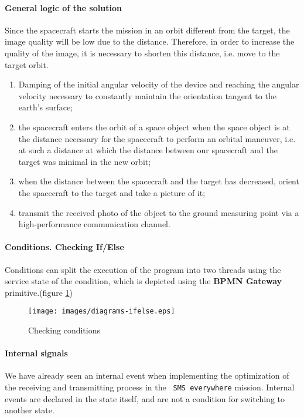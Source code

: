 \documentclass[12pt,a4paper]{article}
\begin{document}
\paragraph{General logic of the solution} 

Since the spacecraft starts the mission in an orbit different from the target, the image quality will be low due to the distance. Therefore, in order to increase the quality of the image, it is necessary to shorten this distance, i.e. move to the target orbit.

\begin{enumerate}
\item Damping of the initial angular velocity of the device and reaching the angular velocity necessary to constantly maintain the orientation tangent to the earth's surface;
\item the spacecraft enters the orbit of a space object when the space object is at the distance necessary for the spacecraft to perform an orbital maneuver, i.e. at such a distance at which the distance between our spacecraft and the target was minimal in the new orbit;
\item when the distance between the spacecraft and the target has decreased, orient the spacecraft to the target and take a picture of it;
\item transmit the received photo of the object to the ground measuring point via a high-performance communication channel.
\end{enumerate}

\paragraph{Conditions. Checking If/Else} Conditions can split the execution of the program into two threads using the service state of the condition, which is depicted using the \textbf{BPMN Gateway} primitive.(figure \ref{Pic:IfElse})

\begin{figure}[tbh]
  \begin{center}
    \texttt{[image: images/diagrams-ifelse.eps]}
    \caption{Checking conditions}
    \label{Pic:IfElse}
  \end{center}
\end{figure}

\paragraph{Internal signals} We have already seen an internal event when implementing the optimization of the receiving and transmitting process in the \verb' SMS everywhere' mission. Internal events are declared in the state itself, and are not a condition for switching to another state.
\end{document}
